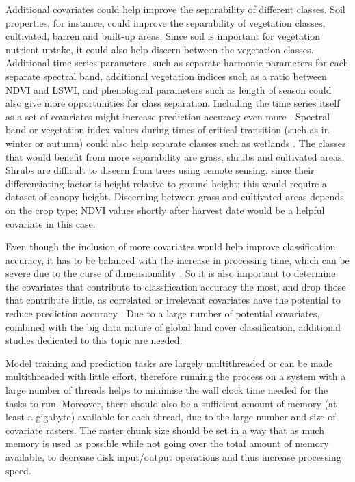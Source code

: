 \documentclass[a4paper,12pt]{scrbook}
\begin{document}
Additional covariates could help improve the separability of different classes. Soil properties, for instance, could improve the separability of vegetation classes, cultivated, barren and built-up areas. Since soil is important for vegetation nutrient uptake, it could also help discern between the vegetation classes. Additional time series parameters, such as separate  harmonic parameters for each separate spectral band, additional vegetation indices such as a ratio between NDVI and LSWI, and phenological parameters such as length of season could also give more opportunities for class separation. Including the time series itself as a set of covariates might increase prediction accuracy even more \citep{Pelletier2016hardrf}. Spectral band or vegetation index values during times of critical transition (such as in winter or autumn) could also help separate classes such as wetlands \citep{davranche2010wetland}. The classes that would benefit from more separability are grass, shrubs and cultivated areas. Shrubs are difficult to discern from trees using remote sensing, since their differentiating factor is height relative to ground height; this would require a dataset of canopy height. Discerning between grass and cultivated areas depends on the crop type; NDVI values shortly after harvest date would be a helpful covariate in this case.

Even though the inclusion of more covariates would help improve classification accuracy, it has to be balanced with the increase in processing time, which can be severe due to the curse of dimensionality \citep{Pelletier2016hardrf}. So it is also important to determine the covariates that contribute to classification accuracy the most, and drop those that contribute little, as correlated or irrelevant covariates have the potential to reduce prediction accuracy \citep{walton2008subpixelrf}. Due to a large number of potential covariates, combined with the big data nature of global land cover classification, additional studies dedicated to this topic are needed.

Model training and prediction tasks are largely multithreaded or can be made multithreaded with little effort, therefore running the process on a system with a large number of threads helps to minimise the wall clock time needed for the tasks to run. Moreover, there should also be a sufficient amount of memory (at least a gigabyte) available for each thread, due to the large number and size of covariate rasters. The raster chunk size should be set in a way that as much memory is used as possible while not going over the total amount of memory available, to decrease disk input/output operations and thus increase processing speed.
\end{document}
